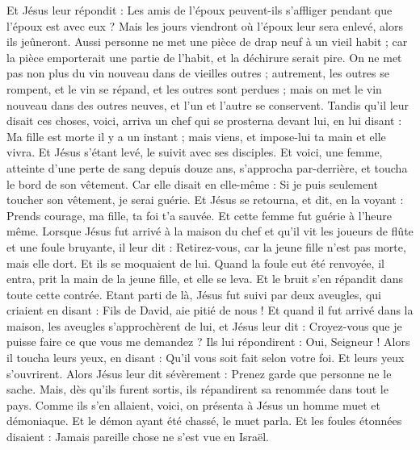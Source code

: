 \begin{multicols}{2}
Et Jésus leur répondit : Les amis de l'époux peuvent-ils s'affliger pendant que l'époux est avec eux ? Mais les jours viendront où l'époux leur sera enlevé, alors ils jeûneront.
Aussi personne ne met une pièce de drap neuf à un vieil habit ; car la pièce emporterait une partie de l'habit, et la déchirure serait pire.
On ne met pas non plus du vin nouveau dans de vieilles outres ; autrement, les outres se rompent, et le vin se répand, et les outres sont perdues ; mais on met le vin nouveau dans des outres neuves, et l'un et l'autre se conservent.
Tandis qu'il leur disait ces choses, voici, arriva un chef qui se prosterna devant lui, en lui disant : Ma fille est morte il y a un instant ; mais viens, et impose-lui ta main et elle vivra.
Et Jésus s'étant levé, le suivit avec ses disciples.
Et voici, une femme, atteinte d'une perte de sang depuis douze ans, s'approcha par-derrière, et toucha le bord de son vêtement.
Car elle disait en elle-même : Si je puis seulement toucher son vêtement, je serai guérie.
Et Jésus se retourna, et dit, en la voyant : Prends courage, ma fille, ta foi t'a sauvée. Et cette femme fut guérie à l'heure même.
Lorsque Jésus fut arrivé à la maison du chef et qu'il vit les joueurs de flûte et une foule bruyante,
il leur dit : Retirez-vous, car la jeune fille n'est pas morte, mais elle dort. Et ils se moquaient de lui.
Quand la foule eut été renvoyée, il entra, prit la main de la jeune fille, et elle se leva.
Et le bruit s'en répandit dans toute cette contrée.
Etant parti de là, Jésus fut suivi par deux aveugles, qui criaient en disant : Fils de David, aie pitié de nous !
Et quand il fut arrivé dans la maison, les aveugles s'approchèrent de lui, et Jésus leur dit : Croyez-vous que je puisse faire ce que vous me demandez ? Ils lui répondirent : Oui, Seigneur !
Alors il toucha leurs yeux, en disant : Qu'il vous soit fait selon votre foi.
Et leurs yeux s'ouvrirent. Alors Jésus leur dit sévèrement : Prenez garde que personne ne le sache.
Mais, dès qu'ils furent sortis, ils répandirent sa renommée dans tout le pays.
Comme ils s'en allaient, voici, on présenta à Jésus un homme muet et démoniaque.
Et le démon ayant été chassé, le muet parla. Et les foules étonnées disaient : Jamais pareille chose ne s'est vue en Israël.

\end{multicols}
